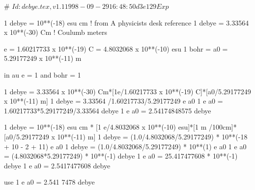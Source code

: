 # $Id: debye.tex,v 1.1 1998-09-29 16:48:50 d3e129 Exp $

1 debye = 10**(-18) esu cm      ! from A physicists desk reference
1 debye = 3.33564 x  10**(-30) Cm  ! Coulumb meters



e = 1.60217733 x 10**(-19) C = 4.8032068 x 10**(-10) esu
1 bohr = a0 = 5.29177249 x 10**(-11) m

in au e = 1 and bohr = 1


1 debye = 3.33564 x 10**(-30) Cm*[1e/1.60217733 x 10**(-19) C]*[a0/5.29177249 x 10**(-11) m]
1 debye = 3.33564 /1.60217733/5.29177249 e a0
1 e a0 = 1.60217733*5.29177249/3.33564 debye
1 e a0 = 2.54174848575 debye


1 debye = 10**(-18) esu cm * [1 e/4.8032068 x 10**(-10) esu]*[1 m /100cm]*[a0/5.29177249 x 10**(-11) m]
1 debye = (1.0/4.8032068/5.29177249) * 10**(-18 + 10 - 2 + 11) e a0
1 debye = (1.0/4.8032068/5.29177249) * 10**(1) e a0
1 e a0  = (4.8032068*5.29177249) * 10**(-1) debye
1 e a0  = 25.417477608 * 10**(-1) debye
1 e a0  = 2.5417477608 debye

use 1 e a0 = 2.541 7478 debye
